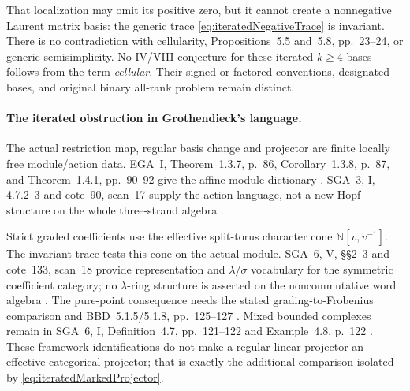 That localization may omit its positive zero, but it
cannot create a nonnegative Laurent matrix basis:
the generic trace \eqref{eq:iteratedNegativeTrace}
is invariant. There is no contradiction with cellularity,
Propositions~5.5 and~5.8, pp.~23--24, or generic
semisimplicity. No IV/VIII conjecture for these
iterated \(k\ge4\) bases follows from the term
\emph{cellular}. Their signed or factored conventions,
designated bases, and original binary all-rank problem
remain distinct.

\paragraph{The iterated obstruction in Grothendieck's language.}
The actual restriction map, regular basis change and
projector are finite locally free module/action data.
EGA~I, Theorem~1.3.7, p.~86, Corollary~1.3.8, p.~87,
and Theorem~1.4.1, pp.~90--92 give the affine module
dictionary \cite{EGA}.
SGA~3, I, 4.7.2--3 and cote~90, scan~17 supply the
action language, not a new Hopf structure on the whole
three-strand algebra \cite{SGA3,Archive}.

Strict graded coefficients use the effective split-torus
character cone \(\mathbb N[v,v^{-1}]\).
The invariant trace tests this cone on the actual module.
SGA~6, V, \S\S2--3 and cote~133, scan~18 provide
representation and \(\lambda/\sigma\) vocabulary for
the symmetric coefficient category; no \(\lambda\)-ring
structure is asserted on the noncommutative word algebra
\cite{SGA6,Archive}.
The pure-point consequence needs the stated
grading-to-Frobenius comparison and BBD~5.1.5/5.1.8,
pp.~125--127 \cite{BBD}.
Mixed bounded complexes remain in SGA~6, I,
Definition~4.7, pp.~121--122 and Example~4.8,
p.~122 \cite{SGA6}.
These framework identifications do not make a regular
linear projector an effective categorical projector;
that is exactly the additional comparison isolated by
\eqref{eq:iteratedMarkedProjector}.


